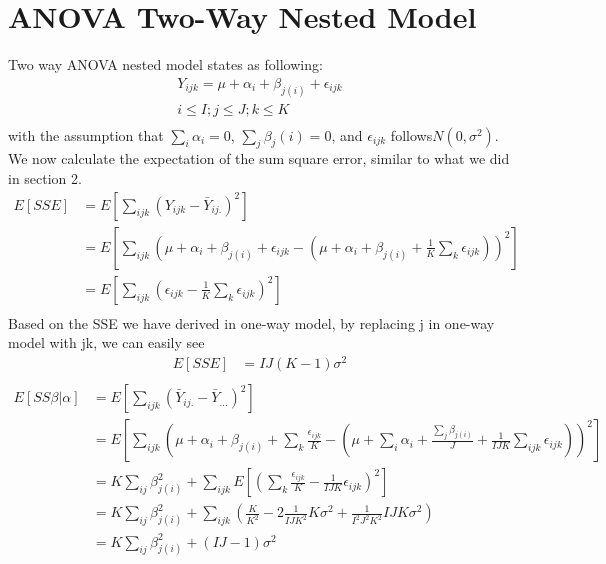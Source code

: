 \documentclass[a4paper]{article}
\begin{document}
\section{ANOVA Two-Way Nested Model}
Two way ANOVA nested model states as following:\\
\begin{align*}
	Y_{ijk} = \mu + \alpha_i + \beta_{j(i)}+ \epsilon_{ijk}\\
	i \leq I; j \leq J; k \leq K \\
\end{align*}
with the assumption that $\sum_i \alpha_i = 0$, $\sum_j \beta_j(i) = 0$, and $\epsilon_{ijk}$ follows$N(0, \sigma^2)$.\\
We now calculate the expectation of the sum square error, similar to what we did in section 2.\\
\begin{align*}
	E[SSE] & = E[\sum_{ijk} (Y_{ijk} - \bar Y_{ij.})^2] \\
	       & = E[\sum_{ijk} (\mu + \alpha_i + \beta_{j(i)}+  \epsilon_{ijk}
	       -(\mu + \alpha_i + \beta_{j(i)}+ \frac{1}{K}\sum_k \epsilon_{ijk}))^2]\\
	       & = E[\sum_{ijk}(\epsilon_{ijk} -\frac{1}{K}\sum_{k} \epsilon_{ijk})^2] \\
\end{align*}
Based on the SSE we have derived in one-way model, by replacing j in one-way model with jk, we can easily see\\
\begin{align*}
	E[SSE] & = IJ(K-1) \sigma^2\\
\end{align*}
\begin{align*}
	E[SS\beta|\alpha] & = E[\sum_{ijk}(\bar Y_{ij.} - \bar Y_{...})^2]\\
				& = E[\sum_{ijk}(\mu + \alpha_i +\beta_{j(i)} + \sum_k \frac{\epsilon_{ijk}}{K} 
				-(\mu + \sum_{i} \alpha_i + \frac{\sum_j \beta_{j(i)}}{J}  + \frac{1}{IJK} \sum_{ijk} \epsilon_{ijk}))^2]\\
				& = K \sum_{ij} \beta^2_{j(i)} + \sum_{ijk}E[(\sum_k \frac{\epsilon_{ijk}}{K} 
				- \frac{1}{IJK} \epsilon_{ijk})^2] \\
				& = K \sum_{ij} \beta^2_{j(i)} + \sum_{ijk}(\frac{K}{K^2} - 2\frac{1}{IJK^2}K \sigma^2 
				+ \frac{1}{I^2 J^2 K^2} IJK \sigma^2) \\
				& = K \sum_{ij} \beta^2_{j(i)} + (IJ-1)\sigma^2 \\
\end{align*}
\end{document}
